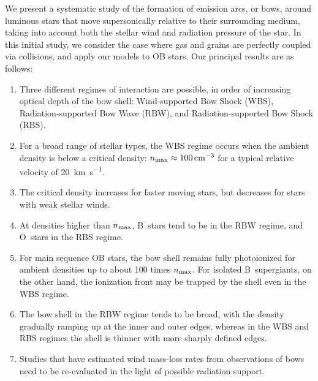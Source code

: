 We present a systematic study of the formation of emission arcs, or
bows, around luminous stars that move supersonically relative to their
surrounding medium, taking into account both the stellar wind and
radiation pressure of the star.  In this initial study, we consider
the case where gas and grains are perfectly coupled via collisions,
and apply our models to OB stars.  Our principal results are as
follows:
\begin{enumerate}[1.]
\item Three different regimes of interaction are possible, in order of
  increasing optical depth of the bow shell: Wind-supported Bow Shock
  (WBS), Radiation-supported Bow Wave (RBW), and Radiation-supported
  Bow Shock (RBS).
\item For a broad range of stellar types, the WBS regime occurs when
  the ambient density is below a critical density:
  \(n_{\text{max}} \approx \SI{100}{cm^{-3}}\) for a typical relative velocity of
  \SI{20}{km.s^{-1}}.
\item The critical density increases for faster moving stars, but
  decreases for stars with weak stellar winds.
\item At densities higher than \(n_{\text{max}}\), B~stars tend to be in the
  RBW regime, and O~stars in the RBS regime.
\item For main sequence OB stars, the bow shell remains fully
  photoionized for ambient densities up to about 100 times
  \(n_{\text{max}}\). For isolated B~supergiants, on the other hand, the
  ionization front may be trapped by the shell even in the WBS regime.
\item The bow shell in the RBW regime tends to be broad, with the
  density gradually ramping up at the inner and outer edges, whereas
  in the WBS and RBS regimes the shell is thinner with more sharply
  defined edges.
\item Studies that have estimated wind mass-loss rates from
  observations of bows need to be re-evaluated in the light of
  possible radiation support. 
\end{enumerate}



